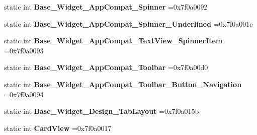 \begin{DoxyCompactItemize}
\mbox{\label{classandroid_1_1support_1_1v7_1_1recyclerview_1_1R_1_1style_a4af07ed5e40e12f147837e6163377f79}} 
static int {\bfseries Base\+\_\+\+Widget\+\_\+\+App\+Compat\+\_\+\+Spinner} =0x7f0a0092
\item 
\mbox{\label{classandroid_1_1support_1_1v7_1_1recyclerview_1_1R_1_1style_af3c9f326520c8203c7dd289c3673556d}} 
static int {\bfseries Base\+\_\+\+Widget\+\_\+\+App\+Compat\+\_\+\+Spinner\+\_\+\+Underlined} =0x7f0a001e
\item 
\mbox{\label{classandroid_1_1support_1_1v7_1_1recyclerview_1_1R_1_1style_a59aaaa5b1d38012f0696c02fe8c7ac51}} 
static int {\bfseries Base\+\_\+\+Widget\+\_\+\+App\+Compat\+\_\+\+Text\+View\+\_\+\+Spinner\+Item} =0x7f0a0093
\item 
\mbox{\label{classandroid_1_1support_1_1v7_1_1recyclerview_1_1R_1_1style_a4c123ebc478a44a0999a3110677b3bae}} 
static int {\bfseries Base\+\_\+\+Widget\+\_\+\+App\+Compat\+\_\+\+Toolbar} =0x7f0a00d0
\item 
\mbox{\label{classandroid_1_1support_1_1v7_1_1recyclerview_1_1R_1_1style_aba4e19676f44c03c816563d2505a6de6}} 
static int {\bfseries Base\+\_\+\+Widget\+\_\+\+App\+Compat\+\_\+\+Toolbar\+\_\+\+Button\+\_\+\+Navigation} =0x7f0a0094
\item 
\mbox{\label{classandroid_1_1support_1_1v7_1_1recyclerview_1_1R_1_1style_af2f254febc96991c0e1cfdffbd6a87a5}} 
static int {\bfseries Base\+\_\+\+Widget\+\_\+\+Design\+\_\+\+Tab\+Layout} =0x7f0a015b
\item 
\mbox{\label{classandroid_1_1support_1_1v7_1_1recyclerview_1_1R_1_1style_a26a3460eba6e12cde5e6e0fb38febdfd}} 
static int {\bfseries Card\+View} =0x7f0a0017
\item 
\mbox{\label{classandroid_1_1support_1_1v7_1_1recyclerview_1_1R_1_1style_a6f9a26bd3db01ef5296aa20d2f3efb1a}} 

\end{DoxyCompactItemize}
